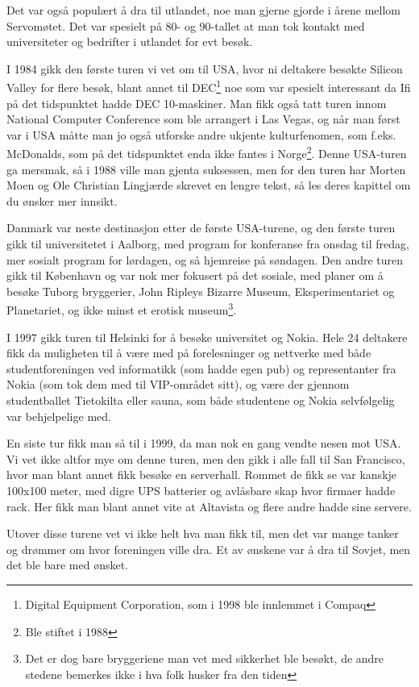 Det var også populært å dra til utlandet, noe man gjerne gjorde i årene mellom Servomøtet. Det var spesielt på 80- og 90-tallet at man tok kontakt med universiteter og bedrifter i utlandet for evt besøk.

I 1984 gikk den første turen vi vet om til USA, hvor ni deltakere besøkte Silicon Valley for flere besøk, blant annet til DEC\footnote{Digital Equipment Corporation, som i 1998 ble innlemmet i Compaq} noe som var spesielt interessant da Ifi på det tidspunktet hadde DEC 10-maskiner. Man fikk også tatt turen innom National Computer Conference som ble arrangert i Las Vegas, og når man først var i USA måtte man jo også utforske andre ukjente kulturfenomen, som f.eks. McDonalds, som på det tidspunktet enda ikke fantes i Norge\footnote{Ble stiftet i 1988}. Denne USA-turen ga mersmak, så i 1988 ville man gjenta suksessen, men for den turen har Morten Moen og Ole Christian Lingjærde skrevet en lengre tekst, så les deres kapittel om du ønsker mer innsikt.

Danmark var neste destinasjon etter de første USA-turene, og den første turen gikk til universitetet i Aalborg, med program for konferanse fra onsdag til fredag, mer sosialt program for lørdagen, og så hjemreise på søndagen. Den andre turen gikk til København og var nok mer fokusert på det sosiale, med planer om å besøke Tuborg bryggerier, John Ripleys Bizarre Museum, Eksperimentariet og Planetariet, og ikke minst et erotisk museum\footnote{Det er dog bare bryggeriene man vet med sikkerhet ble besøkt, de andre stedene bemerkes ikke i hva folk husker fra den tiden}.

I 1997 gikk turen til Helsinki for å besøke universitet og Nokia. Hele 24 deltakere fikk da muligheten til å være med på forelesninger og nettverke med både studentforeningen ved informatikk (som hadde egen pub) og representanter fra Nokia (som tok dem med til VIP-området sitt), og være der gjennom studentballet Tietokilta eller sauna, som både studentene og Nokia selvfølgelig var behjelpelige med.

En siste tur fikk man så til i 1999, da man nok en gang vendte nesen mot USA. Vi vet ikke altfor mye om denne turen, men den gikk i alle fall til San Francisco, hvor man blant annet fikk besøke en serverhall. Rommet de fikk se var kanskje 100x100 meter, med digre UPS batterier og avlåsbare skap hvor firmaer hadde rack. Her fikk man blant annet vite at Altavista og flere andre hadde sine servere.

Utover disse turene vet vi ikke helt hva man fikk til, men det var mange tanker og drømmer om hvor foreningen ville dra. Et av ønskene var å dra til Sovjet, men det ble bare med ønsket.

